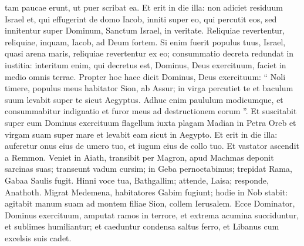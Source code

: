 \begin{biblechapter}
\begin{biblechapter}
\begin{biblechapter}
\begin{biblechapter}
\begin{biblechapter}
\begin{biblechapter}
\begin{biblechapter}
\begin{biblechapter}
\begin{biblechapter}
\begin{biblechapter}
 tam paucae erunt,
 ut puer scribat ea.
 \verse Et erit in die illa:
 non adiciet residuum Israel
 et, qui effugerint de domo Iacob,
 inniti super eo, qui percutit eos,
 sed innitentur super Dominum,
 Sanctum Israel, in veritate.
 \verse Reliquiae revertentur,
 reliquiae, inquam, Iacob, ad Deum fortem.
 \verse Si enim fuerit populus tuus, Israel, quasi arena maris,
 reliquiae revertentur ex eo;
 consummatio decreta redundat in iustitia:
 \verse interitum enim, qui decretus est,
 Dominus, Deus exercituum, faciet in medio omnis terrae.
 \verse Propter hoc haec dicit Dominus, Deus exercituum: “ Noli timere, populus meus habitator Sion, ab Assur; in virga percutiet te et baculum suum levabit super te sicut Aegyptus. 
\verse Adhuc enim paululum modicumque, et consummabitur indignatio et furor meus ad destructionem eorum ”. 
\verse Et suscitabit super eum Dominus exercituum flagellum iuxta plagam Madian in Petra Oreb et virgam suam super mare et levabit eam sicut in Aegypto.
 \verse Et erit in die illa:
 auferetur onus eius de umero tuo,
 et iugum eius de collo tuo.
 Et vastator ascendit a Remmon.
 \verse Veniet in Aiath, transibit per Magron,
 apud Machmas deponit sarcinas suas;
 \verse transeunt vadum cursim; in Geba pernoctabimus;
 trepidat Rama, Gabaa Saulis fugit.
 \verse Hinni voce tua, Bathgallim;
 attende, Laisa; responde, Anathoth.
 \verse Migrat Medemena, habitatores Gabim fugiunt;
 \verse hodie in Nob stabit:
 agitabit manum suam ad montem filiae Sion,
 collem Ierusalem.
 \verse Ecce Dominator, Dominus exercituum,
 amputat ramos in terrore,
 et extrema acumina succiduntur,
 et sublimes humiliantur;
 \verse et caeduntur condensa saltus ferro,
 et Libanus cum excelsis suis cadet.
 

\end{biblechapter}
\end{biblechapter}
\end{biblechapter}
\end{biblechapter}
\end{biblechapter}
\end{biblechapter}
\end{biblechapter}
\end{biblechapter}
\end{biblechapter}
\end{biblechapter}

